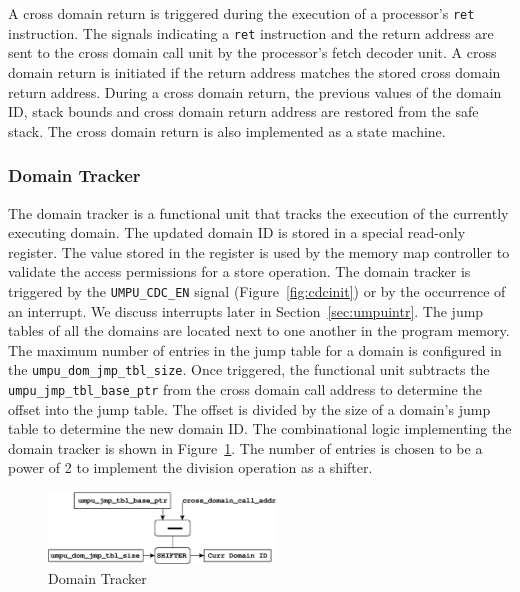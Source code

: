 A cross domain return is triggered during the execution of a processor's \texttt{ret} instruction.
%
The signals indicating a \texttt{ret} instruction and the return address are sent to the cross domain call unit by the processor's fetch decoder unit.
%
A cross domain return is initiated if the return address matches the stored cross domain return address.
%
During a cross domain return, the previous values of the domain ID, stack bounds and cross domain return address are restored from the safe stack.
%
The cross domain return is also implemented as a state machine.
%
\subsubsection{Domain Tracker}
\label{sec:domtracker}
%
The domain tracker is a functional unit that tracks the execution of
the currently executing domain.
%
The updated domain ID is stored in a special read-only register.
%
The value stored in the register is used by the memory map controller
to validate the access permissions for a store operation.
%
The domain tracker is triggered by the \texttt{UMPU\_CDC\_EN} signal
(Figure~\ref{fig:cdcinit}) or by the occurrence of an interrupt.
%
We discuss interrupts later in Section~\ref{sec:umpuintr}.
%
The jump tables of all the domains are located next to one another in
the program memory.
%
The maximum number of entries in the jump table for a domain is
configured in the \texttt{umpu\_dom\_jmp\_tbl\_size}.
%
Once triggered, the functional unit subtracts the
\texttt{umpu\_jmp\_tbl\_base\_ptr} from the cross domain call address
to determine the offset into the jump table.
%
The offset is divided by the size of a domain's jump table to
determine the new domain ID.
%
The combinational logic implementing the domain tracker is shown in
Figure~\ref{fig:domtracker}.
%
The number of entries is chosen to be a power of 2 to implement the
division operation as a shifter.
%
 \begin{figure}[htbp]
    \centering
    \includegraphics[height=0.75in,
    keepaspectratio=true]{figures/domtracker.eps} 
    \caption{Domain Tracker}
    \label{fig:domtracker}
 \end{figure}


